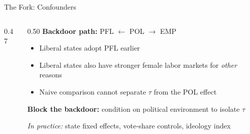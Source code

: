 \begin{frame}{The Fork: Confounders}
  \begin{columns}[T]
    \begin{column}{0.47\textwidth}
      \centering
      \vspace{6pt}
    \end{column}
    \begin{column}{0.50\textwidth}
      \textbf{Backdoor path:}\; PFL $\leftarrow$ POL $\rightarrow$ EMP

      \vspace{8pt}

      \begin{itemize}
        \item Liberal states adopt PFL earlier
        \item Liberal states also have stronger female labor markets for \textit{other} reasons
        \item Naive comparison cannot separate $\tau$ from the POL effect
      \end{itemize}

      \vspace{8pt}

      \textbf{\textcolor{usfgreen}{Block the backdoor:}} condition on political environment to isolate $\tau$

      \textit{In practice:} state fixed effects, vote-share controls, ideology index
    \end{column}
  \end{columns}
\end{frame}


